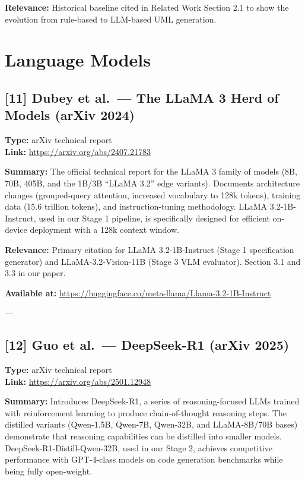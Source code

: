 \documentclass[11pt]{article}
\begin{document}
\textbf{Relevance:} Historical baseline cited in Related Work Section 2.1 to show the evolution from rule-based to LLM-based UML generation.

\section{Language Models}

\subsection*{[11] Dubey et al.\ — The LLaMA 3 Herd of Models (arXiv 2024)}
\textbf{Type:} arXiv technical report \\
\textbf{Link:} \url{https://arxiv.org/abs/2407.21783}

\textbf{Summary:} The official technical report for the LLaMA 3 family of models (8B, 70B, 405B, and the 1B/3B ``LLaMA 3.2'' edge variants). Documents architecture changes (grouped-query attention, increased vocabulary to 128k tokens), training data (15.6 trillion tokens), and instruction-tuning methodology. LLaMA 3.2-1B-Instruct, used in our Stage 1 pipeline, is specifically designed for efficient on-device deployment with a 128k context window.

\textbf{Relevance:} Primary citation for LLaMA 3.2-1B-Instruct (Stage 1 specification generator) and LLaMA-3.2-Vision-11B (Stage 3 VLM evaluator). Section 3.1 and 3.3 in our paper.

\textbf{Available at:} \url{https://huggingface.co/meta-llama/Llama-3.2-1B-Instruct}

---

\subsection*{[12] Guo et al.\ — DeepSeek-R1 (arXiv 2025)}
\textbf{Type:} arXiv technical report \\
\textbf{Link:} \url{https://arxiv.org/abs/2501.12948}

\textbf{Summary:} Introduces DeepSeek-R1, a series of reasoning-focused LLMs trained with reinforcement learning to produce chain-of-thought reasoning steps. The distilled variants (Qwen-1.5B, Qwen-7B, Qwen-32B, and LLaMA-8B/70B bases) demonstrate that reasoning capabilities can be distilled into smaller models. DeepSeek-R1-Distill-Qwen-32B, used in our Stage 2, achieves competitive performance with GPT-4-class models on code generation benchmarks while being fully open-weight.
\end{document}
